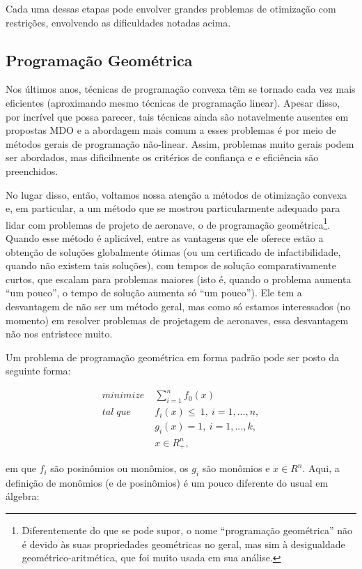 \documentclass{article}
\begin{document}
Cada uma dessas etapas pode envolver grandes problemas de otimização
com restrições, envolvendo as dificuldades notadas acima.

\subsection{Programação Geométrica}

Nos últimos anos, técnicas de programação convexa têm se tornado cada
vez mais eficientes (aproximando mesmo técnicas de programação
linear).  Apesar disso, por incrível que possa parecer, tais técnicas
ainda são notavelmente ausentes em propostas MDO\cite{hoburg} e a
abordagem mais comum a esses problemas é por meio de métodos gerais de
programação não-linear. Assim, problemas muito gerais podem ser
abordados, mas dificilmente os critérios de confiança e e eficiência
são preenchidos.

No lugar disso, então, voltamos nossa atenção a métodos de otimização
convexa e, em particular, a um método que se mostrou particularmente
adequado para lidar com problemas de projeto de aeronave, o de
programação geométrica\footnote{Diferentemente do que se pode supor, o
  nome ``programação geométrica'' não é devido às suas propriedades
  geométricas no geral, mas sim à desigualdade geométrico-aritmética,
  que foi muito usada em sua análise.}. Quando esse método é
aplicável, entre as vantagens que ele oferece estão a obtenção de
soluções globalmente ótimas (ou um certificado de infactibilidade,
quando não existem tais soluções), com tempos de solução
comparativamente curtos, que escalam para problemas maiores (isto é,
quando o problema aumenta ``um pouco'', o tempo de solução aumenta só
``um pouco''). Ele tem a desvantagem de não ser um método geral, mas
como só estamos interessados (no momento) em resolver problemas de
projetagem de aeronaves, essa desvantagem não nos entristece muito.

Um problema de programação geométrica em forma padrão pode ser posto
da seguinte forma:

\begin{align*}
  minimize \;& \sum\limits_{i=1}^n f_0(x)\\ tal\; que\;& f_i(x) \leq\
  1,\ i = 1, ..., n,\\ & g_i(x) = 1,\ i = 1, ..., k,\\ & x \in R^n_{+},
\end{align*}

\noindent em que $f_i$ são posinômios ou monômios, os $g_i$ são
monômios e $x \in R^n$. Aqui, a definição de monômios (e de
posinômios) é um pouco diferente do usual em álgebra:
\end{document}
